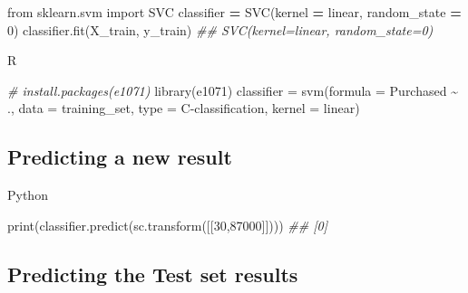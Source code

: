 \documentclass[
]{book}
\newenvironment{Shaded}{\begin{snugshade}}{\end{snugshade}}
\newcommand{\AttributeTok}[1]{\textcolor[rgb]{0.77,0.63,0.00}{#1}}
\newcommand{\BuiltInTok}[1]{#1}
\newcommand{\CommentTok}[1]{\textcolor[rgb]{0.56,0.35,0.01}{\textit{#1}}}
\newcommand{\DecValTok}[1]{\textcolor[rgb]{0.00,0.00,0.81}{#1}}
\newcommand{\FunctionTok}[1]{\textcolor[rgb]{0.00,0.00,0.00}{#1}}
\newcommand{\ImportTok}[1]{#1}
\newcommand{\NormalTok}[1]{#1}
\newcommand{\OperatorTok}[1]{\textcolor[rgb]{0.81,0.36,0.00}{\textbf{#1}}}
\newcommand{\OtherTok}[1]{\textcolor[rgb]{0.56,0.35,0.01}{#1}}
\newcommand{\SpecialCharTok}[1]{\textcolor[rgb]{0.00,0.00,0.00}{#1}}
\newcommand{\StringTok}[1]{\textcolor[rgb]{0.31,0.60,0.02}{#1}}
\theoremstyle{definition}
\theoremstyle{definition}
\theoremstyle{definition}
\theoremstyle{definition}
\theoremstyle{remark}
\begin{document}
\begin{Shaded}
\begin{Highlighting}[]
\ImportTok{from}\NormalTok{ sklearn.svm }\ImportTok{import}\NormalTok{ SVC}
\NormalTok{classifier }\OperatorTok{=}\NormalTok{ SVC(kernel }\OperatorTok{=} \StringTok{\textquotesingle{}linear\textquotesingle{}}\NormalTok{, random\_state }\OperatorTok{=} \DecValTok{0}\NormalTok{)}
\NormalTok{classifier.fit(X\_train, y\_train)}
\CommentTok{\#\# SVC(kernel=\textquotesingle{}linear\textquotesingle{}, random\_state=0)}
\end{Highlighting}
\end{Shaded}

R

\begin{Shaded}
\begin{Highlighting}[]
\CommentTok{\# install.packages(\textquotesingle{}e1071\textquotesingle{})}
\FunctionTok{library}\NormalTok{(e1071)}
\NormalTok{classifier }\OtherTok{=} \FunctionTok{svm}\NormalTok{(}\AttributeTok{formula =}\NormalTok{ Purchased }\SpecialCharTok{\textasciitilde{}}\NormalTok{ .,}
                 \AttributeTok{data =}\NormalTok{ training\_set,}
                 \AttributeTok{type =} \StringTok{\textquotesingle{}C{-}classification\textquotesingle{}}\NormalTok{,}
                 \AttributeTok{kernel =} \StringTok{\textquotesingle{}linear\textquotesingle{}}\NormalTok{)}
\end{Highlighting}
\end{Shaded}

\hypertarget{predicting-a-new-result-5}{%
\subsection{Predicting a new result}\label{predicting-a-new-result-5}}

Python

\begin{Shaded}
\begin{Highlighting}[]
\BuiltInTok{print}\NormalTok{(classifier.predict(sc.transform([[}\DecValTok{30}\NormalTok{,}\DecValTok{87000}\NormalTok{]])))}
\CommentTok{\#\# [0]}
\end{Highlighting}
\end{Shaded}

\hypertarget{predicting-the-test-set-results-4}{%
\subsection{Predicting the Test set results}\label{predicting-the-test-set-results-4}}
\end{document}
